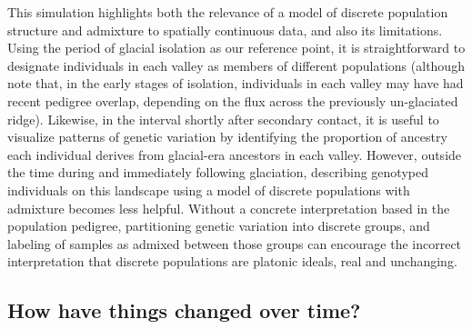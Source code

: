 \documentclass{ar-1col}
\begin{document}
This simulation highlights both the relevance of 
a model of discrete population structure and admixture
to spatially continuous data, 
and also its limitations.
Using the period of glacial isolation as our reference point, 
it is straightforward to designate individuals in each valley 
as members of different populations 
(although note that, in the early stages of isolation, 
individuals in each valley may have had recent pedigree overlap, 
depending on the flux across the previously un-glaciated ridge).
Likewise, 
in the interval shortly after secondary contact, 
it is useful to visualize patterns of genetic variation 
by identifying the proportion of ancestry 
each individual derives from glacial-era ancestors in each valley.
However, 
outside the time during and immediately following glaciation, 
describing genotyped individuals on this landscape 
using a model of discrete populations with admixture 
becomes less helpful.
Without a concrete interpretation based in the population pedigree,
partitioning genetic variation into discrete groups, 
and labeling of samples as admixed between those groups
can encourage the incorrect interpretation that discrete populations are platonic ideals,
real and unchanging.

\subsection{How have things changed over time?}
\end{document}
